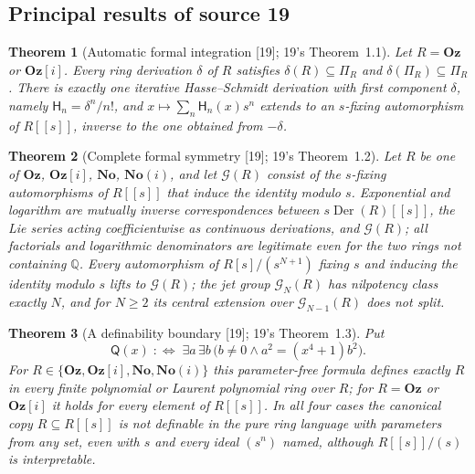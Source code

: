 \documentclass[11pt,oneside]{article}
\numberwithin{equation}{section}
\newtheorem{theorem}{Theorem}[section]
\theoremstyle{definition}
\theoremstyle{remark}
\newcommand{\No}{\mathbf{No}}
\newcommand{\Oz}{\mathbf{Oz}}
\newcommand{\Og}{\mathbf{Oz}[i]}
\newcommand{\SC}{\mathbf{No}(i)}
\newcommand{\Q}{\mathbb Q}
\newcommand{\src}[1]{\textup{\textsf{\small[#1]}}}
\newcommand{\Der}{\operatorname{Der}}
\begin{document}
\subsection{Principal results of source 19}\label{opa:hs:sub:results}

\begin{theorem}[Automatic formal integration \src{19}; 19's Theorem~1.1]\label{opa:hs:thm:integration}
Let $R=\Oz$ or $\Og$. Every ring derivation $\delta$ of $R$ satisfies $\delta(R)\subseteq\Pi_R$ and $\delta(\Pi_R)\subseteq\Pi_R$. There is exactly
one iterative Hasse--Schmidt derivation with first component $\delta$, namely $\mathsf H_n=\delta^n/n!$, and $x\mapsto\sum_n\mathsf H_n(x)s^n$
extends to an $s$-fixing automorphism of $R[[s]]$, inverse to the one obtained from $-\delta$.
\end{theorem}

\begin{theorem}[Complete formal symmetry \src{19}; 19's Theorem~1.2]\label{opa:hs:thm:lie}
Let $R$ be one of $\Oz$, $\Og$, $\No$, $\SC$, and let $\mathcal G(R)$ consist of the $s$-fixing automorphisms of $R[[s]]$ that induce the
identity modulo $s$.
Exponential and logarithm are mutually inverse correspondences between $s\Der(R)[[s]]$, the Lie series acting coefficientwise as
continuous derivations, and $\mathcal G(R)$; all factorials and logarithmic denominators are legitimate even for the two rings not
containing $\Q$. Every automorphism of $R[s]/(s^{N+1})$ fixing $s$ and inducing the identity modulo $s$ lifts to $\mathcal G(R)$; the jet
group $\mathcal G_N(R)$ has nilpotency class exactly $N$, and for $N\ge2$ its central extension over $\mathcal G_{N-1}(R)$ does not split.
\end{theorem}

\begin{theorem}[A definability boundary \src{19}; 19's Theorem~1.3]\label{opa:hs:thm:logic}
Put
\begin{equation}\label{opa:hs:eq:quartic}
 \mathsf Q(x)\;:\Longleftrightarrow\;\exists a\,\exists b\,\bigl(b\ne0\wedge a^2=(x^4+1)b^2\bigr).
\end{equation}
For $R\in\{\Oz,\Og,\No,\SC\}$ this parameter-free formula defines exactly $R$ in every finite polynomial or Laurent polynomial ring over
$R$; for $R=\Oz$ or $\Og$ it holds for every element of $R[[s]]$. In all four cases the canonical copy $R\subseteq R[[s]]$ is not definable in
the pure ring language with parameters from any set, even with $s$ and every ideal $(s^n)$ named, although $R[[s]]/(s)$ is interpretable.
\end{theorem}
\end{document}
